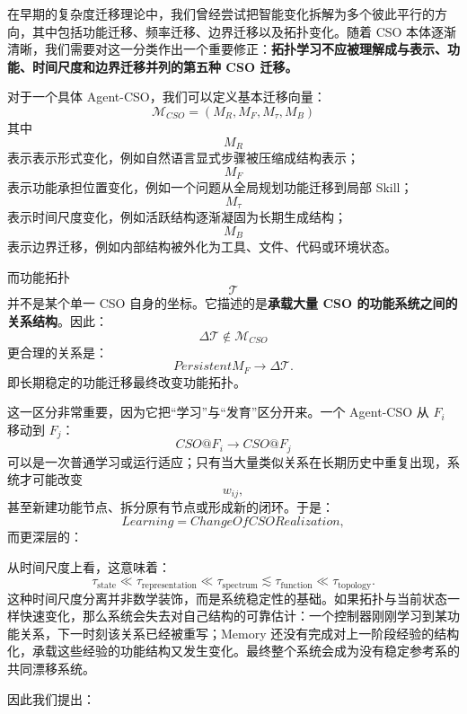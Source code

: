 在早期的复杂度迁移理论中，我们曾经尝试把智能变化拆解为多个彼此平行的方向，其中包括功能迁移、频率迁移、边界迁移以及拓扑变化。随着 CSO 本体逐渐清晰，我们需要对这一分类作出一个重要修正：\textbf{拓扑学习不应被理解成与表示、功能、时间尺度和边界迁移并列的第五种 CSO 迁移。}

对于一个具体 Agent-CSO，我们可以定义基本迁移向量：
\[
\boxed{
\mathcal{M}_{CSO}
=
\left(
M_R,
M_F,
M_\tau,
M_B
\right)
}
\]
其中
\[
M_R
\]
表示表示形式变化，例如自然语言显式步骤被压缩成结构表示；
\[
M_F
\]
表示功能承担位置变化，例如一个问题从全局规划功能迁移到局部 Skill；
\[
M_\tau
\]
表示时间尺度变化，例如活跃结构逐渐凝固为长期生成结构；
\[
M_B
\]
表示边界迁移，例如内部结构被外化为工具、文件、代码或环境状态。

而功能拓扑
\[
\mathcal{T}
\]
并不是某个单一 CSO 自身的坐标。它描述的是\textbf{承载大量 CSO 的功能系统之间的关系结构}。因此：
\[
\boxed{
\Delta\mathcal{T}
\notin
\mathcal M_{CSO}
}
\]
更合理的关系是：
\[
\boxed{
PersistentM_F
\longrightarrow
\Delta\mathcal{T}.
}
\]
即长期稳定的功能迁移最终改变功能拓扑。

这一区分非常重要，因为它把``学习''与``发育''区分开来。一个 Agent-CSO 从 $F_i$ 移动到 $F_j$：
\[
CSO@F_i
\rightarrow
CSO@F_j
\]
可以是一次普通学习或运行适应；只有当大量类似关系在长期历史中重复出现，系统才可能改变
\[
w_{ij},
\]
甚至新建功能节点、拆分原有节点或形成新的闭环。于是：
\[
\boxed{
Learning
=
ChangeOfCSORealization,
}
\]
而更深层的：
\begin{statementbox}
\centering
{}
\end{statementbox}

从时间尺度上看，这意味着：
\[
\tau_{\mathrm{state}}
\ll
\tau_{\mathrm{representation}}
\ll
\tau_{\mathrm{spectrum}}
\lesssim
\tau_{\mathrm{function}}
\ll
\tau_{\mathrm{topology}}.
\]
这种时间尺度分离并非数学装饰，而是系统稳定性的基础。如果拓扑与当前状态一样快速变化，那么系统会失去对自己结构的可靠估计：一个控制器刚刚学习到某功能关系，下一时刻该关系已经被重写；Memory 还没有完成对上一阶段经验的结构化，承载这些经验的功能结构又发生变化。最终整个系统会成为没有稳定参考系的共同漂移系统。

因此我们提出：
\begin{statementbox}
\centering
{}
\end{statementbox}

